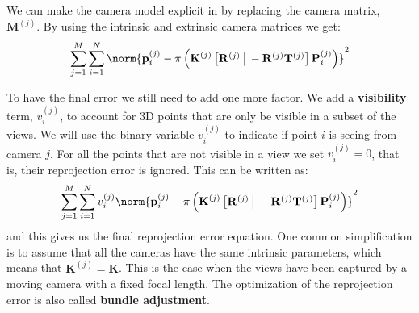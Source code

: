 We can make the camera model explicit in \eqn{\ref{eq:sfm:rep_error}} by replacing the camera matrix, $\mathbf{M}^{(j)}$. By using the intrinsic and extrinsic camera matrices we get:
\begin{equation}
\sum_{j=1}^M \sum_{i=1}^N 
\norm{ \mathbf{p}^{(j)}_i - \pi \left( \mathbf{K}^{(j)} 
\begin{bmatrix}
\mathbf{R}^{(j)} ~ \vline ~ -\mathbf{R}^{(j)}\mathbf{T}^{(j)} 
\end{bmatrix}
\mathbf{P}^{(j)}_i \right) 
} ^2 
\end{equation}

To have the final error we still need to add one more factor. We add a {\bf visibility} term, $v_i^{(j)}$, to account for 3D points that are only be visible in a subset of the views.  We will use the binary variable $v_i^{(j)}$ to indicate if point $i$ is seeing from camera $j$. For all the points that are not visible in a view we set $v_i^{(j)}=0$, that is, their reprojection error is ignored. This can be written as:
\begin{equation}
\sum_{j=1}^M \sum_{i=1}^N 
v_i^{(j)}
\norm{ 
\mathbf{p}^{(j)}_i - \pi \left( \mathbf{K}^{(j)} 
\begin{bmatrix}
\mathbf{R}^{(j)} ~ \vline ~ -\mathbf{R}^{(j)}\mathbf{T}^{(j)} 
\end{bmatrix}
\mathbf{P}^{(j)}_i \right) 
} ^2 
\label{eq:final_reprojection_error}
\end{equation}
and this gives us the final reprojection error equation. One common simplification is to assume that all the cameras have the same intrinsic parameters, which means that $\mathbf{K}^{(j)}=\mathbf{K}$. This is the case when the views have been captured by a moving camera with a fixed focal length. The optimization of the reprojection error is also called {\bf bundle adjustment}. 






